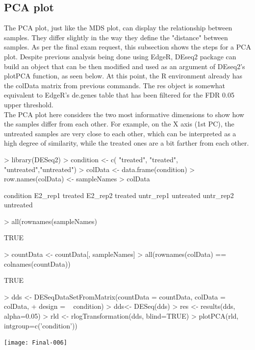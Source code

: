 \documentclass[a4paper,11pt]{article}
\begin{document}
\subsection{PCA plot}
The PCA plot, just like the MDS plot, can display the relationship between samples. They differ slightly in the way they define the "distance" between samples. As per the final exam request, this subsection shows the steps for a PCA plot. Despite previous analysis being done using EdgeR, DEseq2 package can build an object that can be then modified and used as an argument of DEseq2's plotPCA function, as seen below. At this point, the R environment already has the colData matrix from previous commands. The res object is somewhat equivalent to EdgeR's de.genes table that has been filtered for the FDR 0.05 upper threshold.\\

The PCA plot here considers the two most informative dimensions to show how the samples differ from each other. For example, on the X axis (1st PC), the untreated samples are very close to each other, which can be interpreted as a high degree of similarity, while the treated ones are a bit farther from each other.\\

\begin{Schunk}
\begin{Sinput}
> library(DESeq2)
> condition <- c( "treated", "treated", "untreated","untreated")
> colData <- data.frame(condition)
> row.names(colData) <- sampleNames
> colData
\end{Sinput}
\begin{Soutput}
          condition
E2_rep1     treated
E2_rep2     treated
untr_rep1 untreated
untr_rep2 untreated
\end{Soutput}
\begin{Sinput}
> all(rownames(sampleNames) %
\end{Sinput}
\begin{Soutput}
[1] TRUE
\end{Soutput}
\begin{Sinput}
> countData <- countData[, sampleNames]
> all(rownames(colData) == colnames(countData))
\end{Sinput}
\begin{Soutput}
[1] TRUE
\end{Soutput}
\begin{Sinput}
> dds <- DESeqDataSetFromMatrix(countData = countData, colData = colData,
+                               design = ~ condition)
> dds<- DESeq(dds)
> res <- results(dds, alpha=0.05)
> rld <- rlogTransformation(dds, blind=TRUE)
> plotPCA(rld, intgroup=c('condition'))
\end{Sinput}
\end{Schunk}
\texttt{[image: Final-006]}
\end{document}
